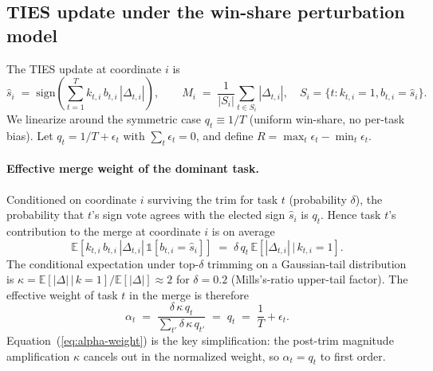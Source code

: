 \subsection{TIES update under the win-share perturbation model}

The TIES update at coordinate $i$ is
\begin{equation}
  \hat{s}_i
  \;=\;
  \mathrm{sign}\!\left(
    \sum_{t=1}^{T} k_{t,i}\, b_{t,i}\, |\Delta_{t,i}|
  \right),
  \qquad
  M_i
  \;=\;
  \frac{1}{|S_i|} \sum_{t \in S_i}\!|\Delta_{t,i}|,
  \quad
  S_i = \{t : k_{t,i} = 1, b_{t,i} = \hat{s}_i\}.
  \label{eq:ties-update}
\end{equation}
We linearize around the symmetric case $q_t \equiv 1/T$ (uniform
win-share, no per-task bias). Let
$q_t = 1/T + \epsilon_t$ with $\sum_t \epsilon_t = 0$, and define
$R = \max_t \epsilon_t - \min_t \epsilon_t$.

\paragraph{Effective merge weight of the dominant task.}
Conditioned on coordinate $i$ surviving the trim for task $t$
(probability $\delta$), the probability that $t$'s sign vote agrees
with the elected sign $\hat{s}_i$ is $q_t$. Hence task $t$'s
contribution to the merge at coordinate $i$ is on average
\begin{equation*}
  \mathbb{E}\!\left[ k_{t,i}\, b_{t,i}\, |\Delta_{t,i}|\, \mathbb{1}[b_{t,i}\!=\!\hat{s}_i] \right]
  \;=\;
  \delta\, q_t\, \mathbb{E}\!\left[|\Delta_{t,i}|\,\big|\, k_{t,i}=1\right].
\end{equation*}
The conditional expectation under top-$\delta$ trimming on a Gaussian-tail
distribution is $\kappa = \mathbb{E}[|\Delta|\,|\,k=1] /
\mathbb{E}[|\Delta|] \approx 2$ for $\delta = 0.2$
(Mills's-ratio upper-tail factor).
The effective weight of task $t$ in the merge is therefore
\begin{equation}
  \alpha_t
  \;=\;
  \frac{\delta\,\kappa\,q_t}{\sum_{t'} \delta\,\kappa\,q_{t'}}
  \;=\;
  q_t
  \;=\;
  \frac{1}{T} + \epsilon_t.
  \label{eq:alpha-weight}
\end{equation}
Equation~(\ref{eq:alpha-weight}) is the key simplification: the
post-trim magnitude amplification $\kappa$ cancels out in the
normalized weight, so $\alpha_t = q_t$ to first order.

